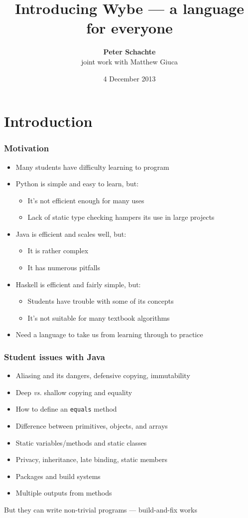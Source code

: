 \documentclass[12pt]{beamer}
\title[Introducing Wybe]{Introducing Wybe --- a language for everyone}
\author[Peter Schachte]
{\textbf{Peter Schachte}  \\
  \small joint work with Matthew Giuca}
\institute[Melbourne]{The University of Melbourne \\ Department of
  Computing and Information Systems}
\date{4 December 2013}
\begin{document}
\frame{\titlepage}

\section{Introduction}

\begin{frame}
\frametitle{Motivation}
\begin{itemize}
\item Many students have difficulty learning to program
\item Python is simple and easy to learn, but:
  \begin{itemize}
  \item It's not efficient enough for many uses
  \item Lack of static type checking hampers its use in large projects
  \end{itemize}
\item Java is efficient and scales well, but:
  \begin{itemize}
  \item It is rather complex
  \item It has numerous pitfalls
  \end{itemize}
\item Haskell is efficient and fairly simple, but:
  \begin{itemize}
  \item Students have trouble with some of its concepts
  \item It's not suitable for many textbook algorithms
  \end{itemize}
\item Need a language to take us from learning through to practice
\end{itemize}
\end{frame}

\begin{frame}
\frametitle{Student issues with Java}
\begin{itemize}
\item Aliasing and its dangers, defensive copying, immutability
\item Deep \emph{vs.} shallow copying and equality
\item How to define an \texttt{equals} method
\item Difference between primitives, objects, and arrays
\item Static variables/methods and static classes
\item Privacy, inheritance, late binding, static members
\item Packages and build systems
\item Multiple outputs from methods
\end{itemize}

But they can write non-trivial programs --- build-and-fix works

\end{frame}
\end{document}
